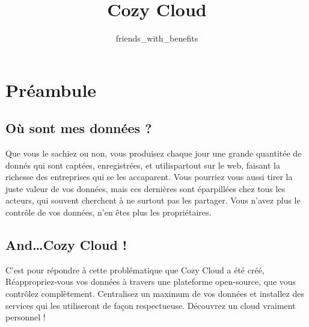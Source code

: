 \documentclass{42-fr}
\begin{document}
                           \title{Cozy Cloud}
                          \subtitle{friends\_with\_benefits}


\maketitle

\tableofcontents


\chapter{Préambule}


	\section{O\`u sont mes donn\'ees ?}

		Que vous le sachiez ou non, vous produisez chaque jour une grande quantit\'ee de donn\'es
		qui sont capt\'ees, enregistr\'ees, et utilis\ees partout sur le web, faisant 
		la richesse des entreprises qui se les accaparent. Vous pourriez vous aussi
		tirer la juste valeur de vos donn\'ees, mais ces dernières sont \'eparpill\'ees
		chez tous les acteurs, qui souvent cherchent \`a ne surtout pas les partager.
		Vous n'avez plus le contrôle de vos donn\'ees, n'en \^etes plus les propri\'etaires.


	\section{And…Cozy Cloud !}

		C'est pour r\'epondre \`a cette probl\'ematique que Cozy Cloud a \'et\'e  cr\'e\'e,
		R\'eappropriez-vous vos donn\'ees à travers une plateforme open-source, que vous contr\^olez
		compl\`etement. Centralisez un maximum de vos donn\'ees et installez des services
		qui les utiliseront de façon respectueuse. D\'ecouvrez un cloud vraiment personnel !
\end{document}
